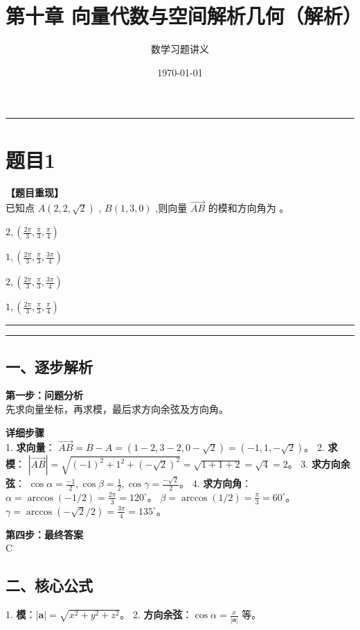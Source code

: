 \documentclass[12pt, a4paper]{ctexart}
\newcommand{\TopSeparator}{
    \par\noindent\rule{\textwidth}{1.5pt}\vspace{0.5em} %
}
\newcommand{\AnalysisSeparator}{
    \par\noindent\rule{\textwidth}{0.5pt}\vspace{0.2em}\hrule\vspace{0.5em} %
}
\newenvironment{RedAnalysis}{
    \par
    \color{red} %
}{
    \par
    \color{black} %
}
\newcommand{\choicesTwo}[4]{
    \begin{enumerate}[label=\Alph*., itemsep=0pt, parsep=0pt, topsep=5pt, labelsep=0.5em]
        \begin{minipage}{0.45\linewidth} \item #1 \end{minipage}
        \begin{minipage}{0.45\linewidth} \item #2 \end{minipage}
        \begin{minipage}{0.45\linewidth} \item #3 \end{minipage}
        \begin{minipage}{0.45\linewidth} \item #4 \end{minipage}
    \end{enumerate}
}
\begin{document}
\title{\textbf{第十章 向量代数与空间解析几何（解析）}}
\author{数学习题讲义}
\date{\today}
\maketitle

\TopSeparator
\section*{题目1}

\textbf{【题目重现】} \\
已知点 $ A(2,2,\sqrt{2}) $ , $ B(1,3,0) $ ,则向量 $ \overrightarrow{AB} $ 的模和方向角为 \underline{\hspace{1cm}}。
\choicesTwo
{$2, (\frac{2\pi}{3},\frac{\pi}{3},\frac{\pi}{4})$}
{$1, (\frac{2\pi}{3},\frac{\pi}{3},\frac{3\pi}{4})$}
{$2, (\frac{2\pi}{3},\frac{\pi}{3},\frac{3\pi}{4})$}
{$1, (\frac{2\pi}{3},\frac{\pi}{3},\frac{\pi}{4})$}

\AnalysisSeparator

\begin{RedAnalysis}

\subsection*{一、逐步解析}

\textbf{第一步：问题分析} \\
先求向量坐标，再求模，最后求方向余弦及方向角。

\textbf{详细步骤} \\
1. \textbf{求向量}：
   $\overrightarrow{AB} = B - A = (1-2, 3-2, 0-\sqrt{2}) = (-1, 1, -\sqrt{2})$。
2. \textbf{求模}：
   $|\overrightarrow{AB}| = \sqrt{(-1)^2 + 1^2 + (-\sqrt{2})^2} = \sqrt{1+1+2} = \sqrt{4} = 2$。
3. \textbf{求方向余弦}：
   $\cos \alpha = \frac{-1}{2}, \cos \beta = \frac{1}{2}, \cos \gamma = \frac{-\sqrt{2}}{2}$。
4. \textbf{求方向角}：
   $\alpha = \arccos(-1/2) = \frac{2\pi}{3} = 120^\circ$。
   $\beta = \arccos(1/2) = \frac{\pi}{3} = 60^\circ$。
   $\gamma = \arccos(-\sqrt{2}/2) = \frac{3\pi}{4} = 135^\circ$。
   
\textbf{第四步：最终答案} \\
C

\subsection*{二、核心公式}
1. \textbf{模}：$|\mathbf{a}| = \sqrt{x^2+y^2+z^2}$。
2. \textbf{方向余弦}：$\cos \alpha = \frac{x}{|\mathbf{a}|}$ 等。

\end{RedAnalysis}
\end{document}
